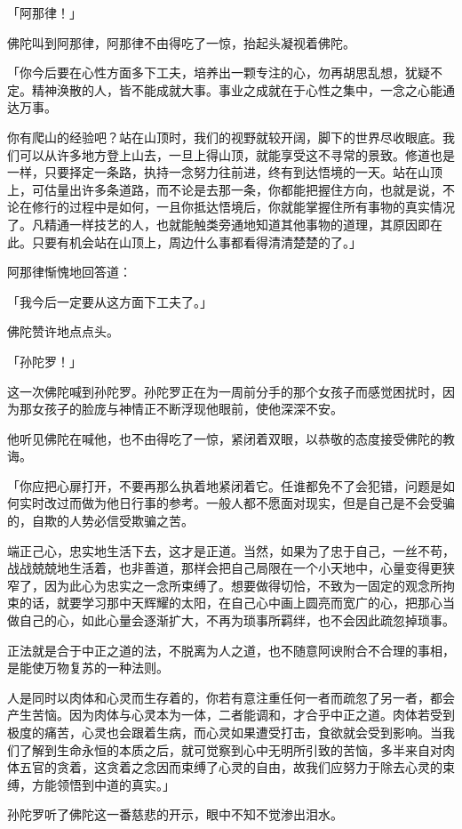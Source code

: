 \documentclass[twoside,openany]{book}
\begin{document}
「阿那律！」

佛陀叫到阿那律，阿那律不由得吃了一惊，抬起头凝视着佛陀。

「你今后要在心性方面多下工夫，培养出一颗专注的心，勿再胡思乱想，犹疑不定。精神涣散的人，皆不能成就大事。事业之成就在于心性之集中，一念之心能通达万事。

你有爬山的经验吧？站在山顶时，我们的视野就较开阔，脚下的世界尽收眼底。我们可以从许多地方登上山去，一旦上得山顶，就能享受这不寻常的景致。修道也是一样，只要择定一条路，执持一念努力往前进，终有到达悟境的一天。站在山顶上，可估量出许多条道路，而不论是去那一条，你都能把握住方向，也就是说，不论在修行的过程中是如何，一且你抵达悟境后，你就能掌握住所有事物的真实情况了。凡精通一样技艺的人，也就能触类旁通地知道其他事物的道理，其原因即在此。只要有机会站在山顶上，周边什么事都看得清清楚楚的了。」

阿那律惭愧地回答道：

「我今后一定要从这方面下工夫了。」

佛陀赞许地点点头。

「孙陀罗！」

这一次佛陀喊到孙陀罗。孙陀罗正在为一周前分手的那个女孩子而感觉困扰时，因为那女孩子的脸庞与神情正不断浮现他眼前，使他深深不安。

他听见佛陀在喊他，也不由得吃了一惊，紧闭着双眼，以恭敬的态度接受佛陀的教诲。

「你应把心扉打开，不要再那么执着地紧闭着它。任谁都免不了会犯错，问题是如何实时改过而做为他日行事的参考。一般人都不愿面对现实，但是自己是不会受骗的，自欺的人势必信受欺骗之苦。

端正己心，忠实地生活下去，这才是正道。当然，如果为了忠于自己，一丝不苟，战战兢兢地生活着，也非善道，那样会把自己局限在一个小天地中，心量变得更狭窄了，因为此心为忠实之一念所束缚了。想要做得切恰，不致为一固定的观念所拘束的话，就要学习那中天辉耀的太阳，在自己心中画上圆亮而宽广的心，把那心当做自己的心，如此心量会逐渐扩大，不再为琐事所羁绊，也不会因此疏忽掉琐事。

正法就是合于中正之道的法，不脱离为人之道，也不随意阿谀附合不合理的事相，是能使万物复苏的一种法则。

人是同时以肉体和心灵而生存着的，你若有意注重任何一者而疏忽了另一者，都会产生苦恼。因为肉体与心灵本为一体，二者能调和，才合乎中正之道。肉体若受到极度的痛苦，心灵也会跟着生病，而心灵如果遭受打击，食欲就会受到影响。当我们了解到生命永恒的本质之后，就可觉察到心中无明所引致的苦恼，多半来自对肉体五官的贪着，这贪着之念因而束缚了心灵的自由，故我们应努力于除去心灵的束缚，方能领悟到中道的真实。」

孙陀罗听了佛陀这一番慈悲的开示，眼中不知不觉渗出泪水。
\end{document}
